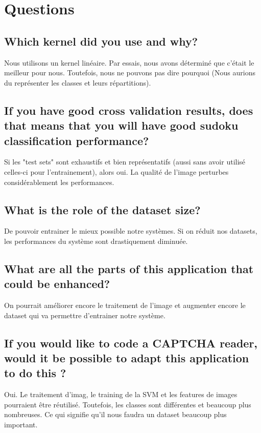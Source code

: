 
\chapter{Questions} %

\label{Chapitre 4.1} %




\section{Which kernel did you use and why?}
Nous utilisons un kernel linéaire. Par essais, nous avons déterminé que c'était le meilleur pour nous. Toutefois, nous ne pouvons pas dire pourquoi (Nous aurions du représenter les classes et leurs répartitions).

\section{If you have good cross validation  results, does that means that you will have good sudoku classification  performance?}
Si les "test sets" sont exhaustifs et bien représentatifs (aussi sans avoir utilisé celles-ci pour l'entrainement), alors oui. La qualité de l'image perturbes considérablement les performances. 

\section{What is the role of the dataset size?}
De pouvoir entrainer le mieux possible notre systèmes. Si on réduit nos datasets, les performances du système sont drastiquement diminuée.

\section{What are all the parts of this application that could be enhanced?}
On pourrait améliorer encore le traitement de l'image et augmenter encore le dataset qui va permettre d'entrainer notre système.

\section{If you would like to code a CAPTCHA reader, would it be possible to adapt this application to do this ?} 
Oui. Le traitement d'imag, le training de la SVM et les features de images pourraient être réutilisé. Toutefois, les classes sont différentes et beaucoup plus nombreuses. Ce qui signifie qu'il nous faudra un dataset beaucoup plus important.




